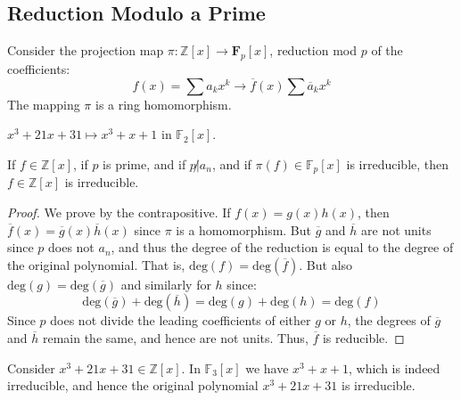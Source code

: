     \subsection{Reduction Modulo a Prime}
        Consider the projection map
        $\pi:\mathbb{Z}[x]\rightarrow\mathbf{F}_{p}[x]$, reduction mod $p$
        of the coefficients:
        \begin{equation}
            f(x)=\sum{a}_{k}x^{k}\longrightarrow
                \overline{f}(x)\sum\overline{a}_{k}x^{k}
        \end{equation}
        The mapping $\pi$ is a ring homomorphism.
        \begin{example}
            $x^{3}+21x+31\mapsto{x}^{3}+x+1$ in $\mathbb{F}_{2}[x]$.
        \end{example}
        \begin{theorem}
            If $f\in\mathbb{Z}[x]$, if $p$ is prime, and if $p\not|a_{n}$,
            and if $\pi(f)\in\mathbb{F}_{p}[x]$ is irreducible, then
            $f\in\mathbb{Z}[x]$ is irreducible.
        \end{theorem}
        \begin{proof}
            We prove by the contrapositive. If $f(x)=g(x)h(x)$, then
            $\overline{f}(x)=\overline{g}(x)\overline{h}(x)$ since $\pi$ is
            a homomorphism. But $\overline{g}$ and $\overline{h}$ are not
            units since $p$ does not $a_{n}$, and thus the degree of the
            reduction is equal to the degree of the original polynomial.
            That is, $\textrm{deg}(f)=\textrm{deg}(\overline{f})$. But also
            $\textrm{deg}(g)=\textrm{deg}(\overline{g})$ and similarly for
            $h$ since:
            \begin{equation}
                \textrm{deg}(\overline{g})+\textrm{deg}(\overline{h})
                =\textrm{deg}(g)+\textrm{deg}(h)=\textrm{deg}(f)
            \end{equation}
            Since $p$ does not divide the leading coefficients of either
            $g$ or $h$, the degrees of $\overline{g}$ and $\overline{h}$
            remain the same, and hence are not units. Thus, $\overline{f}$
            is reducible.
        \end{proof}
        \begin{example}
            Consider $x^{3}+21x+31\in\mathbb{Z}[x]$. In $\mathbb{F}_{3}[x]$
            we have $x^{3}+x+1$, which is indeed irreducible, and hence
            the original polynomial $x^{3}+21x+31$ is irreducible.
        \end{example}
